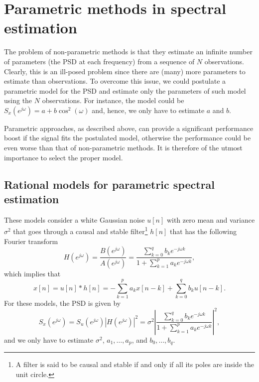 \section{Parametric methods in spectral estimation}

The problem of non-parametric methods is that they estimate an infinite number of parameters (the PSD at each frequency) from a sequence of $N$ observations. Clearly, this is an ill-posed problem since there are (many) more parameters to estimate than observations. To overcome this issue, we could postulate a parametric model for the PSD and estimate only the parameters of such model using the $N$ observations. For instance, the model could be $S_x(e^{j \omega})  = a + b \cos^2(\omega)$ and, hence, we only have to estimate $a$ and $b$.

Parametric approaches, as described above, can provide a significant performance boost if the signal fits the postulated model, otherwise the performance could be even worse than that of non-parametric methods. It is therefore of the utmost importance to select the proper model.

\subsection{Rational models for parametric spectral estimation}

These models consider a white Gaussian noise $u[n]$ with zero mean and variance $\sigma^2$ that goes through a causal and stable filter\footnote{A filter is said to be causal and stable if and only if all its poles are inside the unit circle.} $h[n]$ that has the following Fourier transform
\begin{equation*}
	H(e^{j \omega}) = \frac{B(e^{j \omega})}{A(e^{j \omega})} = \frac{\displaystyle \sum_{k = 0}^{q} b_k e^{-j \omega k}}{\displaystyle 1 + \sum_{k = 1}^{p} a_k e^{-j \omega k}},
\end{equation*}
which implies that
\begin{equation}
	\label{eq:signal_model_ARMA}
	x[n] = u[n] \ast h[n] = - \sum_{k = 1}^{p} a_k x[n -k] + \sum_{k = 0}^{q} b_k u[n-k].
\end{equation}
For these models, the PSD  is given by
\begin{equation}
\label{eq:PSD_ARMA}
S_x(e^{j \omega}) = S_u(e^{j \omega}) |H(e^{j \omega})|^2 = \sigma^2 \left|\frac{\displaystyle \sum_{k = 0}^{q} b_k e^{-j \omega k}}{\displaystyle 1 + \sum_{k = 1}^{p} a_k e^{-j \omega k}}\right|^2,
\end{equation}
and we only have to estimate $\sigma^2$, $a_1, \ldots, a_p$, and $b_0, \ldots, b_q$. 


